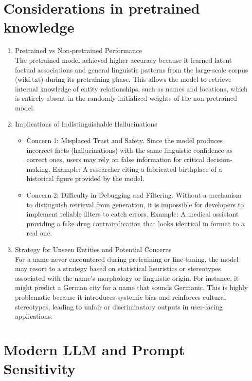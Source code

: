 \documentclass{article}
\begin{document}
\section{Considerations in pretrained knowledge}
\begin{enumerate}
    \item[a.] Pretrained vs Non-pretrained Performance \\
    The pretrained model achieved higher accuracy because it learned latent factual associations and general linguistic patterns from the large-scale corpus (wiki.txt) during its pretraining phase. This allows the model to retrieve internal knowledge of entity relationships, such as names and locations, which is entirely absent in the randomly initialized weights of the non-pretrained model.

    \item[b.] Implications of Indistinguishable Hallucinations \\
    \begin{itemize}
        \item Concern 1: Misplaced Trust and Safety. Since the model produces incorrect facts (hallucinations) with the same linguistic confidence as correct ones, users may rely on false information for critical decision-making. Example: A researcher citing a fabricated birthplace of a historical figure provided by the model.
        \item Concern 2: Difficulty in Debugging and Filtering. Without a mechanism to distinguish retrieval from generation, it is impossible for developers to implement reliable filters to catch errors. Example: A medical assistant providing a fake drug contraindication that looks identical in format to a real one.
    \end{itemize}

    \item[c.] Strategy for Unseen Entities and Potential Concerns \\
    For a name never encountered during pretraining or fine-tuning, the model may resort to a strategy based on statistical heuristics or stereotypes associated with the name's morphology or linguistic origin. For instance, it might predict a German city for a name that sounds Germanic. This is highly problematic because it introduces systemic bias and reinforces cultural stereotypes, leading to unfair or discriminatory outputs in user-facing applications.
\end{enumerate}

\section{Modern LLM and Prompt Sensitivity}
\end{document}
